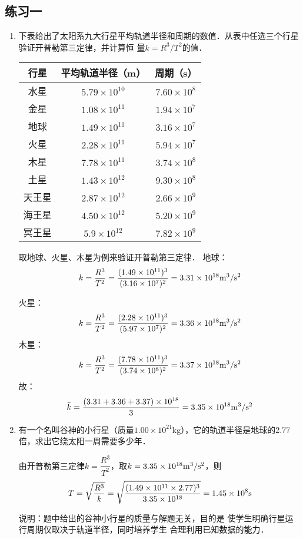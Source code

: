 \subsection{练习一}
\begin{enumerate}
	\item 下表给出了太阳系九大行星平均轨道半径和周期的数值．从表中任选三个行星验证开普勒第三定律，并计算恒
	量$k=R^3/T^2$的值．
\begin{center}
	\begin{tabular}{ccc}
\hline
行星    &  平均轨道半径（m）  & 周期（s）\\
\hline
水星      &  $5.79\times 10^{10}$    & $7.60\times 10^8$ \\ 
金星    &  $1.08\times 10^{11}$    &  $1.94\times 10^7$ \\ 
地球    &  $1.49\times 10^{11}$    &  $3.16\times 10^7$ \\ 
火星    &  $2.28\times 10^{11}$    &  $5.94\times 10^7$ \\ 
木星    &  $7.78\times 10^{11}$    &  $3.74\times 10^8$ \\ 
土星    &  $1.43\times 10^{12}$    &  $9.30\times 10^8$ \\ 
天王星    & $2.87\times 10^{12}$     &  $2.66\times 10^9$ \\ 
海王星    &  $4.50\times 10^{12}$    &  $5.20\times 10^9$ \\ 
冥王星    & $5.9\times 10^{12}$     &  $7.82\times 10^9$ \\ 
\hline
	\end{tabular}
\end{center}


\begin{solution}
	取地球、火星、木星为例来验证开普勒第三定律．
地球：
\[k=\frac{R^3}{T^2}=\frac{(1.49\times 10^{11})^3}{(3.16\times 10^{7})^2} =3.31\times 10^{18}  {\rm m^3/s^2}\]

火星：\[k=\frac{R^3}{T^2}=\frac{(2.28\times 10^{11})^3}{(5.97\times 10^{7})^2} =3.36\times 10^{18}   {\rm m^3/s^2}\]
木星：\[k=\frac{R^3}{T^2}=\frac{(7.78\times 10^{11})^3}{(3.74\times 10^{8})^2} = 3.37\times 10^{18}  {\rm m^3/s^2}\]
故：\[\bar k=\frac{(3.31+3.36+3.37)\times 10^{18} }{3}=3.35\times 10^{18}  {\rm m^3/s^2}\]
\end{solution}

\item 有一个名叫谷神的小行星（质量$1.00\times 10^{21}$kg），它的轨道半径是地球的2.77倍，求出它绕太阳一周需要多少年．

\begin{solution}
	由开普勒第三定律$k=\dfrac{R^3}{T^2}$，取$k=3.35\times 10^{18}  {\rm m^3/s^2}$，则
\[T=\sqrt{\frac{R^3}{k}}=\sqrt{\frac{(1.49\times 10^{11}\times 2.77)^3}{3.35\times 10^{18}}}=1.45\times 10^8{\rm s}\]
\end{solution}
说明：题中给出的谷神小行星的质量与解题无关，目的是
使学生明确行星运行周期仅取决于轨道半径，同时培养学生
合理利用已知数据的能力．
\end{enumerate}






